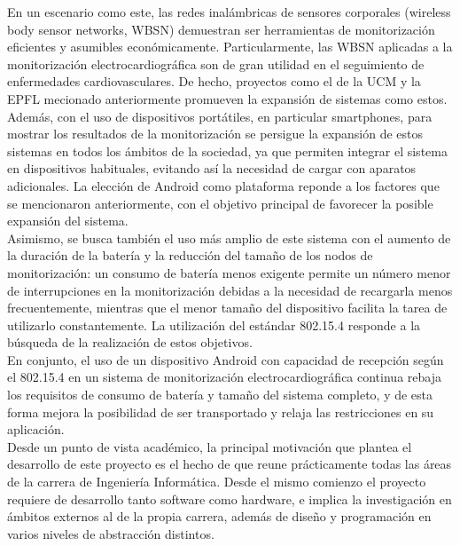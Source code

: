 	En un escenario como este, las redes inalámbricas de sensores corporales (wireless body sensor
	networks, WBSN) demuestran ser herramientas de monitorización eficientes y asumibles
	económicamente. Particularmente, las WBSN aplicadas a la monitorización electrocardiográfica son
	de gran utilidad en el seguimiento de enfermedades cardiovasculares. De hecho, proyectos como el
	de la UCM y la EPFL mecionado anteriormente promueven la expansión de sistemas como estos.\\

	Además, con el uso de dispositivos portátiles, en particular smartphones, para mostrar los
	resultados de la monitorización se persigue la expansión de estos sistemas en todos los ámbitos
	de la sociedad, ya que permiten integrar el sistema en dispositivos habituales, evitando así la
	necesidad de cargar con aparatos adicionales. La elección de Android como plataforma reponde a
	los factores que se mencionaron anteriormente, con el objetivo principal de favorecer la posible
	expansión del sistema.\\

	Asimismo, se busca también el uso más amplio de este sistema con el aumento de la duración de la
	batería y la reducción del tamaño de los nodos de monitorización: un consumo de batería menos
	exigente permite un número menor de interrupciones en la monitorización debidas a la necesidad de
	recargarla menos frecuentemente, mientras que el menor tamaño del dispositivo facilita la tarea
	de utilizarlo constantemente. La utilización del estándar 802.15.4 responde a la búsqueda de la
	realización de estos objetivos.\\

	En conjunto, el uso de un dispositivo Android con capacidad de recepción según el 802.15.4 en un
	sistema de monitorización electrocardiográfica continua rebaja los requisitos de consumo de batería
	y tamaño del sistema completo, y de esta forma mejora la posibilidad de ser transportado y relaja
	las restricciones en su aplicación.\\

	Desde un punto de vista académico, la principal motivación que plantea el desarrollo de este
	proyecto es el hecho de que reune prácticamente todas las áreas de la carrera de Ingeniería
	Informática. Desde el mismo comienzo el proyecto requiere de desarrollo tanto software como
	hardware, e implica la investigación en ámbitos externos al de la propia carrera, además de diseño
	y programación en varios niveles de abstracción distintos.\\

